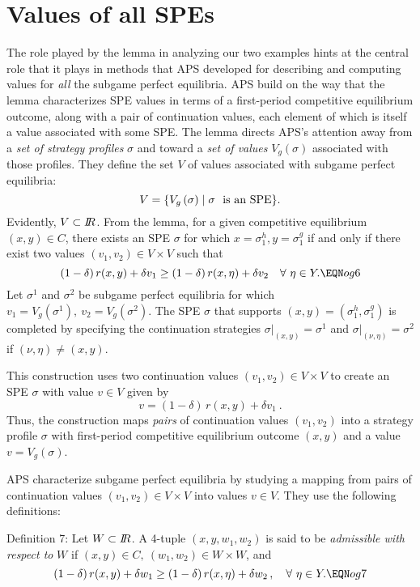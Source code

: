 \section{Values of all SPEs}
The role played by the lemma in analyzing our two examples
hints at the central role that it plays in  methods
that APS  developed for describing
and computing  values for
 {\it all\/} the subgame perfect equilibria.  APS build on the way that the lemma
characterizes SPE values in terms of a first-period competitive  equilibrium
outcome, along with a pair of continuation values, each element of
which is itself a value associated with some SPE. The lemma
directs APS's attention away from a {\it set of strategy
profiles\/}  $\sigma$ and toward a {\it set of values\/}
 $V_g(\sigma)$ associated
with those profiles.  They define the set $V$ of values associated with
subgame perfect equilibria:
$$V=\{ V_g\, (\sigma)\mid \sigma\ \hbox{ is an SPE}
\}.$$
Evidently, $V\subset {{I\kern-0.3em R}}$.  From the lemma, for a given competitive equilibrium $(x,y)\in C$,
there exists an SPE $\sigma$ for which $x=\sigma^h_1,
y=\sigma^g_1$ if and only if there exist two values $(v_1,v_2)\in V\times V$
 such that
$$(1-\delta)\, r(x,y) + \delta v_1\geq (1-\delta)\, r(x,\eta) + \delta
v_2\quad \forall\ \eta\in Y . \EQN og6$$
Let $\sigma^1$ and $\sigma^2$ be subgame perfect equilibria for which $v_1 =
V_g(\sigma^1),\ v_2=V_g(\sigma^2)$.  The SPE $\sigma$
that supports $(x,y) = (\sigma^h_1,\sigma^g_1)$ is completed by specifying the continuation strategies
$\sigma\vert_{(x,y)} = \sigma^1$ and $\sigma\vert_{(\nu,\eta)} = \sigma^2$ if
$(\nu,\eta) \not= (x,y)$.

This construction uses  two continuation values $(v_1,v_2)\in V \times V$ to create an SPE
$\sigma$ with value $v\in V$ given by
$$v = (1-\delta)\, r(x,y) + \delta v_1\ .$$
Thus, the construction maps {\it pairs\/} of continuation values
 $(v_1,v_2)$ into a strategy profile $\sigma$  with
first-period competitive equilibrium outcome $(x,y)$
and a value $v=V_g(\sigma)$.

APS characterize subgame perfect equilibria by studying a mapping
from pairs of continuation
 values $(v_1,v_2)\in V \times V$ into values $v\in V$.  They use the following
definitions:

\medskip\noindent
{\sc Definition 7:}  Let $W\subset  {I\kern-0.3em R}$.  A 4-tuple $(x,y,w_1,w_2)$ is said to be
{\it admissible with respect to\/} $W$ if $(x,y)\in C,\ (w_1,w_2) \in
    W\times W$, and
$$(1-\delta)\, r(x,y)
+\delta w_1 \geq (1-\delta)\, r(x,\eta) + \delta w_2\,,
\quad\forall\ \eta\in Y . \EQN og7$$

